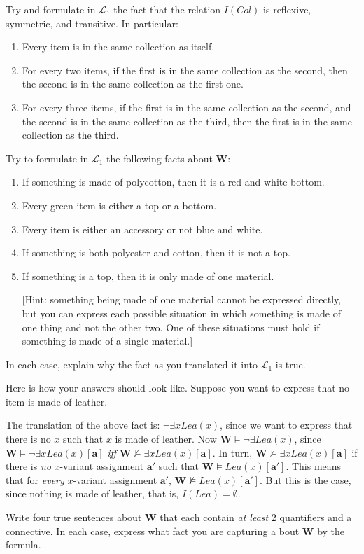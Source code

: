 \begin{exc}
Try and formulate in $\mathcal{L}_1$ the fact that the relation $I(Col)$ is reflexive, symmetric, and transitive. In particular:
\begin{enumerate}
	\item Every item is in the same collection as itself.
	\item For every two items, if the first is in the same collection as the second, then the second is in the same collection as the first one.
	\item For every three items, if the first is in the same collection as the second, and the second is in the same collection as the third, then the first is in the same collection as the third. 
\end{enumerate}
\end{exc}

\begin{exc}
Try to formulate in $\mathcal{L}_1$ the following facts about $\mathbf{W}$:
\begin{enumerate}
	\item If something is made of polycotton, then it is a red and white bottom. 
	\item Every green item is either a top or a bottom. 
	\item Every item is either an accessory or not blue and white. 
	\item If something is both polyester and cotton, then it is not a top. 
	\item If something is a top, then it is only made of one material. 
	
	[Hint: something being made of one material cannot be expressed directly, but you can express each possible situation in which something is made of one thing and not the other two. One of these situations must hold if something is made of a single material.]
\end{enumerate}

In each case, explain why the fact as you translated it into $\mathcal{L}_1$ is true.
\end{exc}

\begin{remark}
Here is how your answers should look like. Suppose you want to express that no item is made of leather. 

The translation of the above fact is: $\neg \exists x Lea(x)$, since we want to express that there is no $x$ such that $x$ is made of leather. Now $\mathbf{W}\models \neg \exists Lea(x)$, since $\mathbf{W} \models \neg \exists x Lea(x)[\mathbf{a}]$ \textit{iff} $\mathbf{W} \not\models \exists x Lea(x)[\mathbf{a}]$. In turn, $\mathbf{W} \not\models \exists x Lea(x)[\mathbf{a}]$ if there is \textit{no} $x$-variant assignment $\mathbf{a}'$ such that $\mathbf{W}\models Lea(x)[\mathbf{a}']$. This means that for \textit{every} $x$-variant assignment $\mathbf{a}'$, $\mathbf{W}\not\models Lea(x)[\mathbf{a}']$. But this is the case, since nothing is made of leather, that is, $I(Lea)=\emptyset$.
\end{remark}

\begin{exc}
Write four true sentences about $\mathbf{W}$ that each contain \textit{at least} 2 quantifiers and a connective. In each case, express what fact you are capturing a bout $\mathbf{W}$ by the formula. 
\end{exc}

